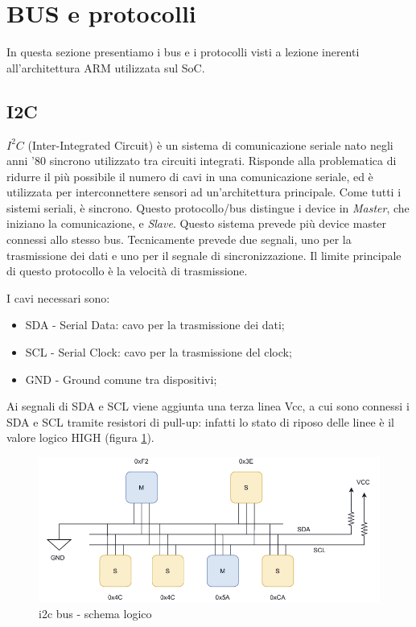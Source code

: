 \section{BUS e protocolli}
In questa sezione presentiamo i bus e i protocolli visti a lezione inerenti all'architettura ARM utilizzata sul SoC.

\subsection{I2C}
$I^2 C$ (Inter-Integrated Circuit) è un sistema di comunicazione seriale nato negli anni '80 sincrono utilizzato tra circuiti integrati. Risponde alla problematica di ridurre il più possibile il numero di cavi in una comunicazione seriale, ed è utilizzata per interconnettere sensori ad un'architettura principale. Come tutti i sistemi seriali, è sincrono. 
Questo protocollo/bus distingue i device in \textit{Master}, che iniziano la comunicazione, e \textit{Slave}. Questo sistema prevede più device master connessi allo stesso bus. Tecnicamente prevede due segnali, uno per la trasmissione dei dati e uno per il segnale di sincronizzazione. Il limite principale di questo protocollo è la velocità di trasmissione. 

I cavi necessari sono:
\begin{itemize}
    \item SDA - Serial Data: cavo per la trasmissione dei dati;
    \item SCL - Serial Clock: cavo per la trasmissione del clock;
    \item GND - Ground comune tra dispositivi;
\end{itemize}

Ai segnali di SDA e SCL viene aggiunta una terza linea Vcc, a cui sono connessi i SDA e SCL tramite resistori di pull-up: infatti lo stato di riposo delle linee è il valore logico HIGH (figura \ref{img:i2c_logic_1}).

\begin{figure}[ht]
    \centering
    \includegraphics[width=.7\textwidth]{img/i2c_1.png}
    \caption{i2c bus - schema logico}
    \label{img:i2c_logic_1}
\end{figure}

